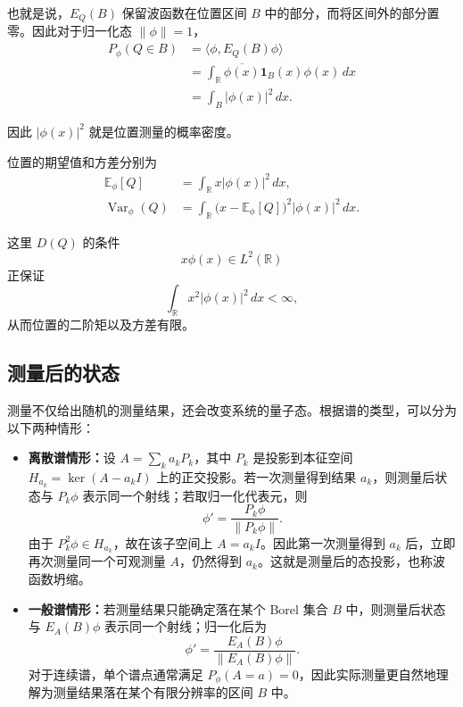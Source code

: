 \documentclass[UTF8,a4paper,11pt,openany]{ctexbook}
\begin{document}
也就是说，$E_Q(B)$ 保留波函数在位置区间 $B$ 中的部分，而将区间外的部分置零。因此对于归一化态 $\|\phi\|=1$，
\begin{align}
    P_\phi(Q\in B)
    &=
    \langle\phi,E_Q(B)\phi\rangle
    \nonumber\\
    &=
    \int_{\mathbb R}
    \overline{\phi(x)}
    \mathbf 1_B(x)\phi(x)\,dx
    \nonumber\\
    &=
    \int_B|\phi(x)|^2\,dx.
\end{align}

因此 $|\phi(x)|^2$ 就是位置测量的概率密度。

位置的期望值和方差分别为
\begin{align}
    \mathbb E_\phi[Q]
    &=
    \int_{\mathbb R}
    x|\phi(x)|^2\,dx,\\
    \operatorname{Var}_\phi(Q)
    &=
    \int_{\mathbb R}
    \bigl(x-\mathbb E_\phi[Q]\bigr)^2
    |\phi(x)|^2\,dx.
\end{align}

这里 $D(Q)$ 的条件
\[
x\phi(x)\in L^2(\mathbb R)
\]
正保证
\[
\int_{\mathbb R}x^2|\phi(x)|^2\,dx<\infty,
\]
从而位置的二阶矩以及方差有限。

\subsection{测量后的状态}

测量不仅给出随机的测量结果，还会改变系统的量子态。根据谱的类型，可以分为以下两种情形：

\begin{itemize}
    \item \textbf{离散谱情形：}设 $A=\sum_k a_kP_k$，其中 $P_k$ 是投影到本征空间 $H_{a_k}=\ker(A-a_kI)$ 上的正交投影。若一次测量得到结果 $a_k$，则测量后状态与 $P_k\phi$ 表示同一个射线；若取归一化代表元，则
    \begin{equation}
        \phi'=\frac{P_k\phi}{\|P_k\phi\|}.
    \end{equation}
    由于 $P_k^2\phi\in H_{a_k}$，故在该子空间上 $A=a_kI$。因此第一次测量得到 $a_k$ 后，立即再次测量同一个可观测量 $A$，仍然得到 $a_k$。这就是测量后的态投影，也称波函数坍缩。

    \item \textbf{一般谱情形：}若测量结果只能确定落在某个 Borel 集合 $B$ 中，则测量后状态与 $E_A(B)\phi$ 表示同一个射线；归一化后为
    \begin{equation}
        \phi'=\frac{E_A(B)\phi}{\|E_A(B)\phi\|}.
    \end{equation}
    对于连续谱，单个谱点通常满足 $P_\phi(A=a)=0$，因此实际测量更自然地理解为测量结果落在某个有限分辨率的区间 $B$ 中。
\end{itemize}
\end{document}
